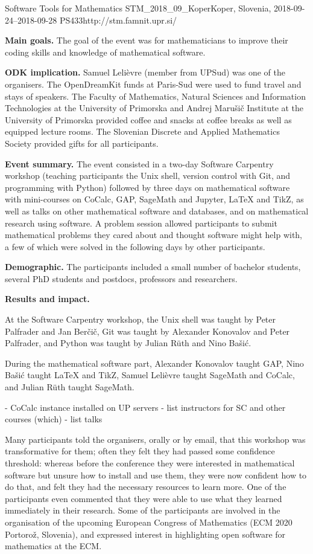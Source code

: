 \begin{event}{Software Tools for Mathematics}%
{STM_2018_09_Koper}{Koper, Slovenia, 2018-09-24--2018-09-28}%
{PS}{43}{3}{http://stm.famnit.upr.si/}

\textbf{Main goals.} The goal of the event was for mathematicians
to improve their coding skills and knowledge of mathematical software.

\textbf{ODK implication.} Samuel Lelièvre (\ODK member from UPSud) was one of
the organisers. The OpenDreamKit funds at Paris-Sud were used to fund travel
and stays of speakers.
The Faculty of Mathematics, Natural Sciences and Information Technologies at the University of Primorska
and Andrej Marušič Institute at the University of Primorska 
provided coffee and snacks at coffee breaks as well as equipped lecture rooms. 
The Slovenian Discrete and Applied Mathematics Society provided gifts for all participants.

\textbf{Event summary.} 
The event consisted in a two-day Software Carpentry
workshop (teaching participants the Unix shell, version control with Git,
and programming with Python) followed by three days on mathematical software
with mini-courses on CoCalc, GAP, SageMath and Jupyter, LaTeX and TikZ, as well
as talks on other mathematical software and databases, and on mathematical
research using software. A problem session allowed participants to submit
mathematical problems they cared about and thought software might help with,
a few of which were solved in the following days by other participants.

\textbf{Demographic.} 
The participants included a small number of bachelor students,
several PhD students and postdocs, professors and researchers.

\textbf{Results and impact.}

At the Software Carpentry workshop, 
the Unix shell was taught by Peter Palfrader and Jan Ber\v{c}i\v{c}, 
Git was taught by Alexander Konovalov and Peter Palfrader,
and Python was taught by Julian R\"{u}th and Nino Ba\v{s}i\'{c}.

During the mathematical software part,
Alexander Konovalov taught GAP,
Nino Ba\v{s}i\'{c} taught LaTeX and TikZ,
Samuel Leli\`{e}vre taught SageMath and CoCalc,
and Julian R\"{u}th taught SageMath.

- CoCalc instance installed on UP servers
- list instructors for SC and other courses (which)
- list talks

Many participants told the organisers, orally or by email, that this workshop
was transformative for them; often they felt they had passed some confidence
threshold: whereas before the conference they were interested in mathematical
software but unsure how to install and use them, they were now confident how
to do that, and felt they had the necessary resources to learn more.
One of the participants even commented that they were able to use what they learned
immediately in their research.
Some of the participants are involved in the organisation of the upcoming 
European Congress of Mathematics (ECM 2020 Portoro\v{z}, Slovenia),
and expressed interest in highlighting open software for mathematics at the ECM.


\end{event}
